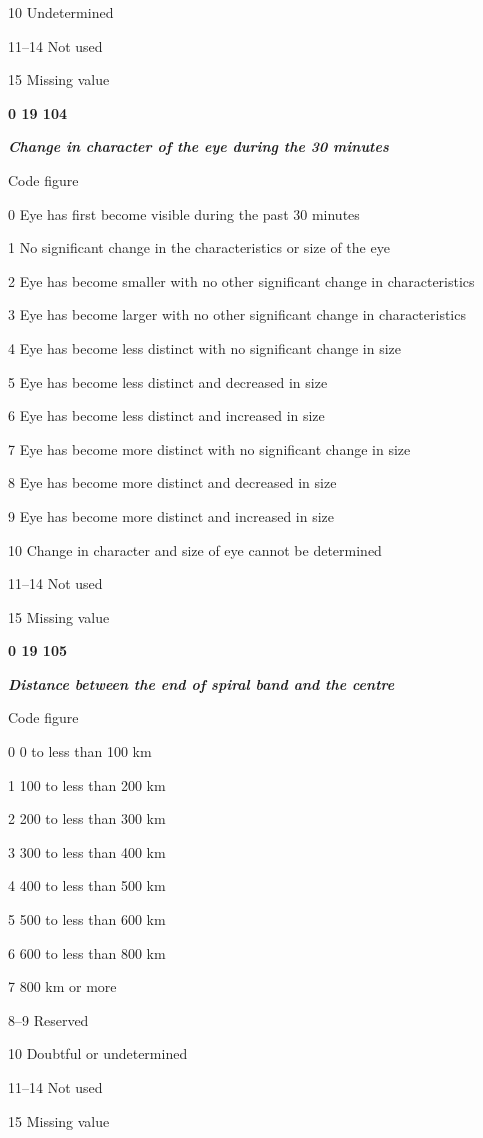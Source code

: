 10 Undetermined

11--14 Not used

15 Missing value

\textbf{0 19 104}

\emph{\textbf{Change in character of the eye during the 30 minutes}}

Code figure

0 Eye has first become visible during the past 30 minutes

1 No significant change in the characteristics or size of the eye

2 Eye has become smaller with no other significant change in characteristics

3 Eye has become larger with no other significant change in characteristics

4 Eye has become less distinct with no significant change in size

5 Eye has become less distinct and decreased in size

6 Eye has become less distinct and increased in size

7 Eye has become more distinct with no significant change in size

8 Eye has become more distinct and decreased in size

9 Eye has become more distinct and increased in size

10 Change in character and size of eye cannot be determined

11--14 Not used

15 Missing value

\textbf{0 19 105}

\emph{\textbf{Distance between the end of spiral band and the centre}}

Code figure

0 0 to less than 100 km

1 100 to less than 200 km

2 200 to less than 300 km

3 300 to less than 400 km

4 400 to less than 500 km

5 500 to less than 600 km

6 600 to less than 800 km

7 800 km or more

8--9 Reserved

10 Doubtful or undetermined

11--14 Not used

15 Missing value

